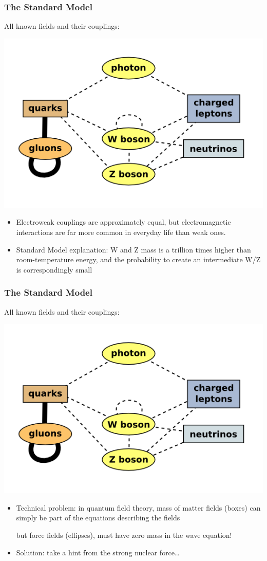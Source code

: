 \documentclass[compress]{beamer}
\begin{document}
\begin{frame}
\frametitle{The Standard Model}

All known fields and their couplings:
\begin{center}
\includegraphics[width=0.6\linewidth]{standard_model.png}
\end{center}

\begin{itemize}
\item Electroweak couplings are approximately equal, but
  electromagnetic interactions are far more common in everyday life than weak ones.
\item Standard Model explanation: W and Z mass is a trillion times higher
  than room-temperature energy, and the probability to create an
  intermediate W/Z is correspondingly small
\end{itemize}
\end{frame}

\begin{frame}
\frametitle{The Standard Model}

All known fields and their couplings:
\begin{center}
\includegraphics[width=0.6\linewidth]{standard_model.png}
\end{center}

\begin{itemize}
\item Technical problem: in quantum field theory, mass of matter
  fields (boxes) can simply be part of the equations describing the
  fields

but force fields (ellipses), must have zero mass in the wave equation!

\item Solution: take a hint from the strong nuclear force\ldots
\end{itemize}
\end{frame}
\end{document}

